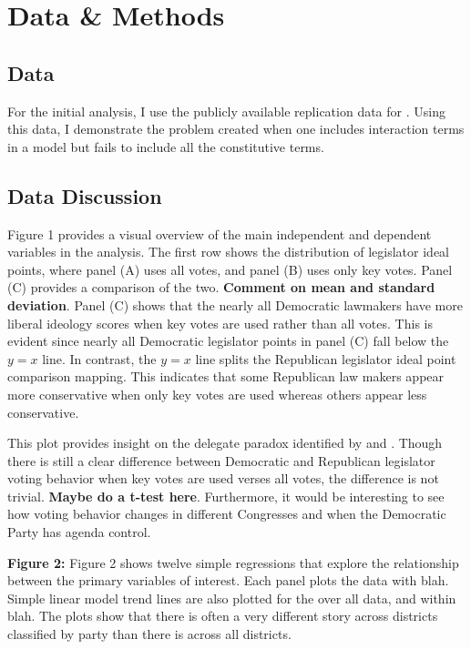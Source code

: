 \documentclass[10pt,letterpaper]{article}
\begin{document}
\section{Data \& Methods} 

\subsection{Data}
For the initial analysis, I use the publicly available \cite{Clinton2009} replication data for \cite{Clinton2006}. Using this data, I demonstrate the problem created when one includes interaction terms in a model but fails to include all the constitutive terms.


\subsection{Data Discussion}
Figure 1 provides a visual overview of the main independent and dependent variables in the \cite{Clinton2006} analysis. The first row shows the distribution of legislator ideal points, where panel (A) uses all votes, and panel (B) uses only key votes. Panel (C) provides a comparison of the two. \textbf{Comment on mean and standard deviation}. Panel (C) shows that the nearly all Democratic lawmakers have more liberal ideology scores when key votes are used rather than all votes. This is evident since nearly all Democratic legislator points in panel (C) fall below the $y=x$ line. In contrast, the $y=x$ line splits the Republican legislator ideal point comparison mapping. This indicates that some Republican law makers appear more conservative when only key votes are used whereas others appear less conservative.

This plot provides insight on the delegate paradox identified by \cite{Broockman2016} and \cite{Ahler2018}. Though there is still a clear difference between Democratic and Republican legislator voting behavior when key votes are used verses all votes, the difference is not trivial. \textbf{Maybe do a t-test here}. Furthermore, it would be interesting to see how voting behavior changes in different Congresses and when the Democratic Party has agenda control.

\textbf{Figure 2:} Figure 2 shows twelve simple regressions that explore the relationship between the primary variables of interest. Each panel plots the data with blah. Simple linear model trend lines are also plotted for the over all data, and within blah. The plots show that there is often a very different story across districts classified by party than there is across all districts.
\end{document}
